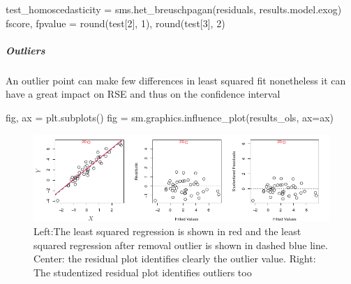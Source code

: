 \begin{python}
test_homoscedasticity = sms.het_breuschpagan(residuals, results.model.exog)
fscore, fpvalue = round(test[2], 1), round(test[3], 2)
\end{python}


\subparagraph{Outliers}
An outlier point can make few differences in least squared fit
nonetheless it can have a great impact on RSE  and thus on the 
confidence interval
\begin{python}
fig, ax = plt.subplots()
fig = sm.graphics.influence_plot(results_ols, ax=ax)
\end{python}
\begin{figure}[H]
	\begin{center}
		\includegraphics[width=\textwidth]{./chap/1chap/2sec/2images/2_9outliers.png}
	\end{center}
	\caption{Left:The least squared regression is shown in red
	and the least squared regression after removal outlier is
	shown in dashed blue line. Center: the residual plot identifies
	clearly the outlier value. Right: The studentized residual plot
	identifies outliers too}
	\label{fig:fig2.8}
\end{figure}



